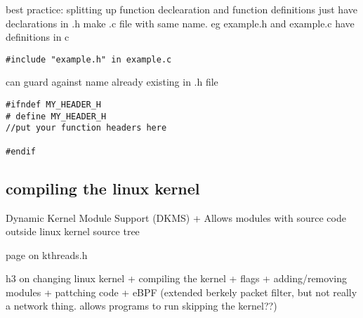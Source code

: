 best practice: splitting up function declearation and function definitions
just have declarations in .h
make .c file with same name. eg example.h and example.c
have definitions in c
\begin{verbatim}
#include "example.h" in example.c
\end{verbatim}


can guard against name already existing in .h file
\begin{verbatim}
#ifndef MY_HEADER_H
# define MY_HEADER_H
//put your function headers here

#endif
\end{verbatim}

\subsection{compiling the linux kernel}
Dynamic Kernel Module Support (DKMS)
+ Allows modules with source code outside linux kernel source tree

page on kthreads.h

h3 on changing linux kernel
+ compiling the kernel
+ flags
+ adding/removing modules
+ pattching code
+ eBPF (extended berkely packet filter, but not really a network thing. allows programs to run skipping the kernel??)

